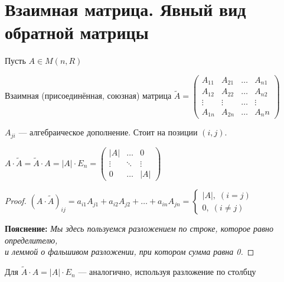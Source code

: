 \section{Взаимная матрица. Явный вид обратной матрицы}

\begin{conj}
    
    Пусть $A \in M(n, R)$

    Взаимная (присоединённая, союзная) матрица $\widetilde{A} =
        \begin{pmatrix}
            A_{11} & A_{21} & \dots & A_{n1} \\
            A_{12} & A_{22} & \dots & A_{n2} \\
            \vdots & \vdots & \dots & \vdots \\
            A_{1n} & A_{2n} & \dots & A_nn
        \end{pmatrix}
    $
    
    $A_{ji}$ --- алгебраическое дополнение. Стоит на позиции $(i, j)$.
\end{conj}

\begin{theorem-non}
    
    $A \cdot \widetilde{A} = \widetilde{A} \cdot A = |A| \cdot E_n =
        \begin{pmatrix}
            |A| & \dots & 0 \\
            \vdots & \ddots & \vdots \\
            0 & \dots & |A|
        \end{pmatrix}
    $


    \begin{proof}
        $(A \cdot \widetilde{A})_{ij} = a_{i1}A_{j1} + a_{i2}A_{j2} + \dots + a_{in}A_{jn} =
            \begin{cases}
                |A|, \; (i = j) \\
                0, \; (i \neq j)
            \end{cases}
        $

        \textbf{Пояснение:}
        \emph{Мы здесь пользуемся разложением по строке,
        которое равно определителю,}\\
        \emph{и леммой о фальшивом разложении, при котором сумма равна 0.}
    \end{proof}

    \notice Для $\widetilde{A} \cdot A = |A| \cdot E_n$ --- аналогично,
    используя разложение по столбцу

\end{theorem-non}

